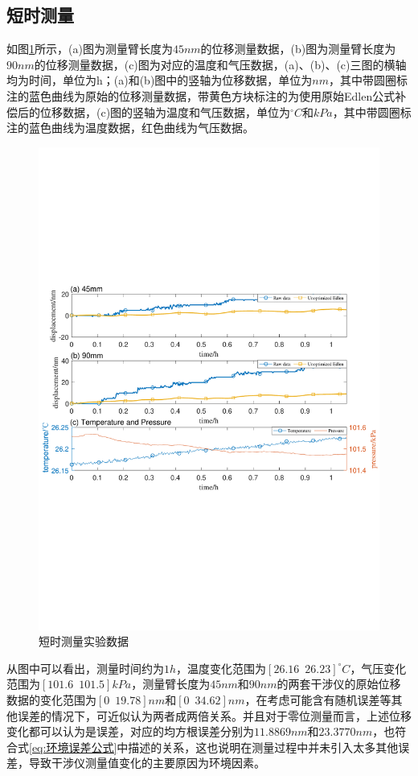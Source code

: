 \subsection{短时测量}
如图\ref{fig:短时测量实验数据}所示，(a)图为测量臂长度为$45nm$的位移测量数据，(b)图为测量臂长度为$90nm$的位移测量数据，(c)图为对应的温度和气压数据，(a)、(b)、(c)三图的横轴均为时间，单位为h；(a)和(b)图中的竖轴为位移数据，单位为$nm$，其中带圆圈标注的蓝色曲线为原始的位移测量数据，带黄色方块标注的为使用原始Edlen公式补偿后的位移数据，(c)图的竖轴为温度和气压数据，单位为$^{\circ}C$和$kPa$，其中带圆圈标注的蓝色曲线为温度数据，红色曲线为气压数据。
\begin{figure}[htb]
    \centering
    \includegraphics[width=14cm]{fig/3-fig/短时测量数据.pdf}
    \caption{短时测量实验数据}
    \label{fig:短时测量实验数据}
\end{figure}
从图中可以看出，测量时间约为$1h$，温度变化范围为$[26.16\,\,\,26.23]^{\circ}C$，气压变化范围为$[101.6\,\,\,101.5]kPa$，测量臂长度为$45nm$和$90nm$的两套干涉仪的原始位移数据的变化范围为$[0\,\,\,19.78]nm$和$[0\,\,\,34.62]nm$，在考虑可能含有随机误差等其他误差的情况下，可近似认为两者成两倍关系。并且对于零位测量而言，上述位移变化都可以认为是误差，对应的均方根误差分别为$11.8869nm$和$23.3770nm$，也符合式\eqref{eq:环境误差公式}中描述的关系，这也说明在测量过程中并未引入太多其他误差，导致干涉仪测量值变化的主要原因为环境因素。

